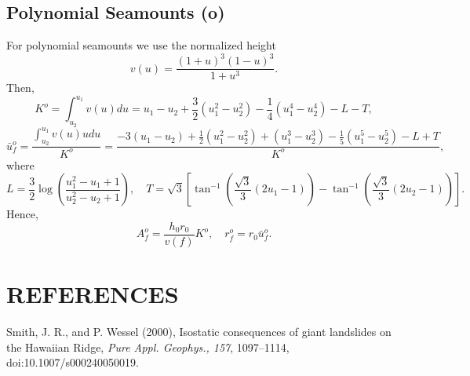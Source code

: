 \documentclass[12pt,letterpaper,margin=0.5in]{report}
\begin{document}
\subsection{Polynomial Seamounts (o)}

For polynomial seamounts we use the normalized height
\begin{equation}
v(u) = \frac{(1 + u)^3 (1 - u)^3}{1 + u^3}.
\end{equation}
Then,
\begin{equation}
K^o = \int_{u_2}^{u_1} v(u) du = u_1 - u_2 + \frac{3}{2}\left (u_1^2 - u_2^2 \right ) - \frac{1}{4} \left (u_1^4 - u_2^4\right ) - L - T,
\end{equation}
\begin{equation}
\bar{u}_f^o = \frac{\int_{u_2}^{u_1} v(u) u du}{K^o} = \frac{- 3 (u_1 - u_2) + \frac{1}{2}(u_1^2 - u_2^2) + (u_1^3 - u_2^3) - \frac{1}{5}(u_1^5 - u_2^5) - L + T}{K^o},
\end{equation}
where 
\begin{equation}
L = \frac{3}{2} \log \left ( \frac{u_1^2 - u_1 + 1}{u_2^2 - u_2 + 1}\right ), \quad T = \sqrt{3} \left [ \tan^{-1} \left (\frac{\sqrt{3}}{3}(2u_1 - 1)\right ) - \tan^{-1} \left (\frac{\sqrt{3}}{3}(2u_2 - 1)\right )\right ].
\end{equation}
Hence,
\begin{equation}
A_f^o = \frac{h_0 r_0}{v(f)} K^o, \quad r_f^o = r_0\bar{u}_f^o.
\end{equation}

\section{REFERENCES}

Smith, J. R., and P. Wessel (2000), Isostatic consequences of giant landslides on the Hawaiian Ridge,
{\it Pure Appl. Geophys., 157}, 1097--1114, doi:10.1007/s000240050019.
\end{document}
